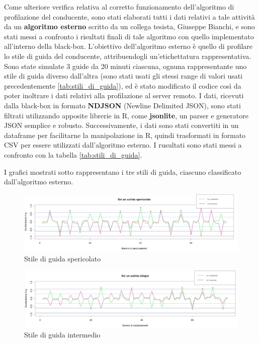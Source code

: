 \documentclass[12pt, a4paper, italian]{report}
\numberwithin{figure}{chapter}
\numberwithin{table}{chapter}
\begin{document}
Come ulteriore verifica relativa al corretto funzionamento dell'algoritmo di profilazione del conducente, sono stati elaborati tutti i dati relativi a tale attività da un \textbf{algoritmo esterno} scritto da un collega tesista, Giuseppe Bianchi,
e sono stati messi a confronto i risultati finali di tale algoritmo con quello implementato all'interno della black-box. L'obiettivo dell'algoritmo esterno è quello di profilare lo stile di guida del conducente, attribuendogli un'etichettatura rappresentativa. Sono state simulate 3 guide da 20 minuti ciascuna, ognuna rappresentante uno stile di guida diverso dall'altra (sono stati usati gli stessi range di valori usati precedentemente \ref{tab:stili_di_guida}), ed è stato modificato il codice così da poter inoltrare i dati relativi alla profilazione al server remoto. I dati, ricevuti dalla black-box in formato \textbf{NDJSON} (Newline Delimited JSON), sono stati filtrati utilizzando apposite librerie in R, come \textbf{jsonlite}, un parser e generatore JSON semplice e robusto. Successivamente, i dati sono stati convertiti in un dataframe per facilitarne la manipolazione in R, quindi trasformati in formato CSV per essere utilizzati dall'algoritmo esterno. I rusultati sono stati messi a confronto con la tabella \ref{tab:stili_di_guida}.

\newpage

I grafici mostrati sotto rappresentano i tre stili di guida, ciascuno classificato dall'algoritmo esterno. 

\vspace{1cm}

\begin{figure}[h]
  \centering
  \includegraphics[width=14cm]{GuidaSpericolata.png}
  \caption{Stile di guida spericolato}
  \label{Guida spericolata}
\end{figure}

\begin{figure}[h]
  \centering
  \includegraphics[width=14cm]{GuidaIntermedia.png}
  \caption{Stile di guida intermedio}
  \label{Guida intermedia}
\end{figure}
\end{document}
